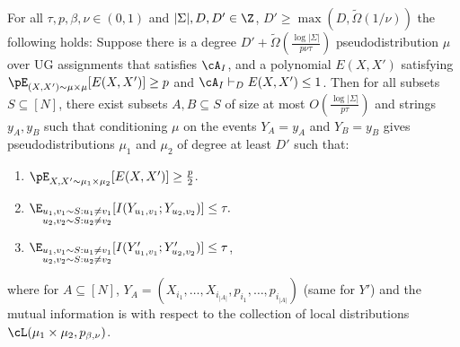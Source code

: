 \begin{lemma}
For all $\tau,p,\beta,\nu \in (0,1)$ and $|\Sigma|, D, D' \in \Z$, $D' \geq \max(D,\widetilde{\Omega}(1/\nu))$ the following holds: Suppose there is a degree $D' + \widetilde{\Omega}(\frac{\log |\Sigma|}{p \nu \tau})$ pseudodistribution $\mu$ over UG assignments that satisfies $\cA_I$, and a polynomial $E(X,X')$ satisfying $\pE_{(X,X') \sim \mu \times \mu}[E(X,X')] \geq p$ and $\cA_I \vdash_D E(X,X') \leq 1$. Then for all subsets $S \subseteq [N]$, there exist subsets $A, B \subseteq S$ of size at most $O(\frac{\log|\Sigma|}{p\tau})$ and strings $y_A, y_B$ such that conditioning $\mu$ on the events $Y_A = y_A$ and $Y_B = y_B$ gives pseudodistributions $\mu_1$ and $\mu_2$ of degree at least $D'$ such that: 
\begin{enumerate}
\item $\pE_{X,X'\sim \mu_1\times\mu_2}[E(X,X')] \geq \frac{p}{2}$.
\item $\E_{\substack{u_1,v_1 \sim S: u_1 \neq v_1\\ u_2,v_2 \sim S: u_2 \neq v_2}}[I(Y_{u_1,v_1};Y_{u_2,v_2})] \leq \tau.$
\item $\E_{\substack{u_1,v_1 \sim S: u_1 \neq v_1\\ u_2,v_2 \sim S: u_2 \neq v_2}}[I(Y'_{u_1,v_1};Y'_{u_2,v_2})] \leq \tau$,
\end{enumerate}
where for $A \subseteq [N]$, $Y_{A} = (X_{i_1},\ldots, X_{i_{|A|}},p_{i_1},\ldots, p_{i_{|A|}})$ (same for $Y'$) and the mutual information is with respect to the collection of local distributions $\cL(\mu_1 \times \mu_2,p_{\beta,\nu})$.
\end{lemma}


